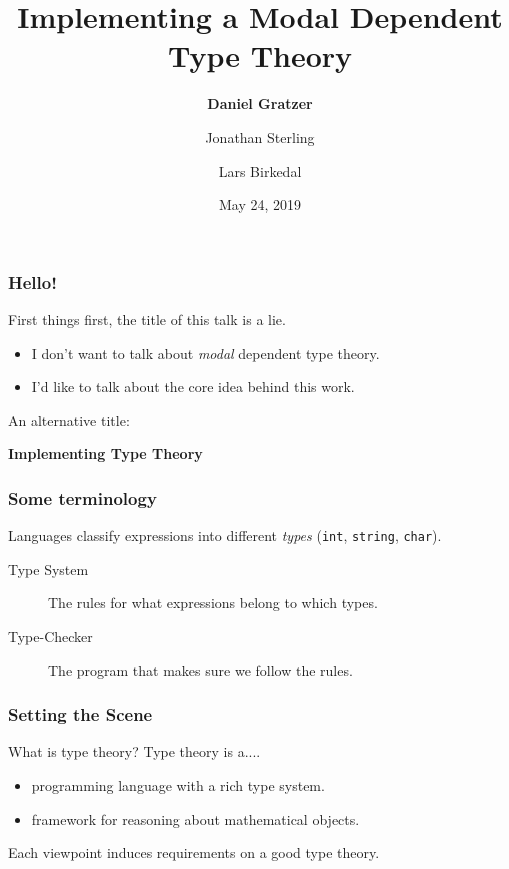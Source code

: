 \documentclass[usenames,dvipsnames,aspectratio=169,12pt]{beamer}
\title{Implementing a Modal Dependent Type Theory}
\author{\textbf{Daniel Gratzer}\inst{1} \and Jonathan Sterling\inst{2} \and Lars Birkedal\inst{1}}
\institute{\inst{1} This University \smiley{} \\ \inst{2} Not This University \frownie{}}
\date{May 24, 2019}
\begin{document}
\begin{frame}[noframenumbering]
  \titlepage
\end{frame}

\begin{frame}
  \frametitle{Hello!}
  First things first, the title of this talk is a lie.
  \pause

  \begin{itemize}
  \item I don't want to talk about \emph{modal} dependent type theory.
  \item I'd like to talk about the core idea behind this work.
  \end{itemize}
  \pause
  \bigskip

  An alternative title:
  \begin{center}
    \Large\bf
    Implementing Type Theory
  \end{center}

\end{frame}

\begin{frame}
  \frametitle{Some terminology}
  Languages classify expressions into different \emph{types}
  (\texttt{\textcolor{CobaltBlue}{int}},
  \texttt{\textcolor{CobaltBlue}{string}},
  \texttt{\textcolor{CobaltBlue}{char}}).
  \pause

  \begin{description}
  \item[Type System] The rules for what expressions belong to which types.
  \item[Type-Checker] The program that makes sure we follow the rules.
  \end{description}

\end{frame}

\begin{frame}
  \frametitle{Setting the Scene}

  What is type theory? Type theory is a....
  \begin{itemize}
  \item programming language with a rich type system.
  \item framework for reasoning about mathematical objects.

  \end{itemize}
  \pause
  \bigskip


  Each viewpoint induces requirements on a good type theory.
\end{frame}
\end{document}
